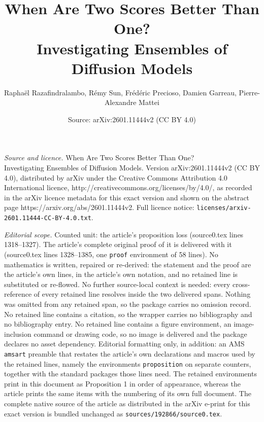 \documentclass[10pt,a4paper]{amsart}
\title{When Are Two Scores Better Than One? \\ Investigating Ensembles of Diffusion Models}
\author{Rapha\"el Razafindralambo, R\'emy Sun, Fr\'ed\'eric Precioso, Damien Garreau, Pierre-Alexandre Mattei}
\date{Source: arXiv:2601.11444v2 (CC BY 4.0)}
\begin{document}
\maketitle

\noindent\emph{Source and licence.} When Are Two Scores Better Than One? \\ Investigating Ensembles of Diffusion Models. Version arXiv:2601.11444v2 (CC BY 4.0), distributed by arXiv under the Creative Commons Attribution 4.0 International licence, http://creativecommons.org/licenses/by/4.0/, as recorded in the arXiv licence metadata for this exact version and shown on the abstract page https://arxiv.org/abs/2601.11444v2. Full licence notice: \texttt{licenses/arxiv-2601.11444-CC-BY-4.0.txt}.\par\smallskip

\noindent\textit{Editorial scope.} Counted unit: the article's proposition loss (source0.tex lines 1318--1327). The article's complete original proof of it is delivered with it (source0.tex lines 1328--1385, one \texttt{proof} environment of 58 lines). No mathematics is written, repaired or re-derived: the statement and the proof are the article's own lines, in the article's own notation, and no retained line is substituted or re-flowed.  No further source-local context is needed: every cross-reference of every retained line resolves inside the two delivered spans.  Nothing was omitted from any retained span, so the package carries no omission record.  No retained line contains a citation, so the wrapper carries no bibliography and no bibliography entry.  No retained line contains a figure environment, an image-inclusion command or drawing code, so no image is delivered and the package declares no asset dependency.  Editorial formatting only, in addition: an AMS \texttt{amsart} preamble that restates the article's own declarations and macros used by the retained lines, namely the environments \texttt{proposition} on separate counters, together with the standard packages those lines need.  The retained environments print in this document as Proposition 1 in order of appearance, whereas the article prints the same items with the numbering of its own full document.  The complete native source of the article as distributed in the arXiv e-print for this exact version is bundled unchanged as \texttt{sources/192866/source0.tex}.
\end{document}
